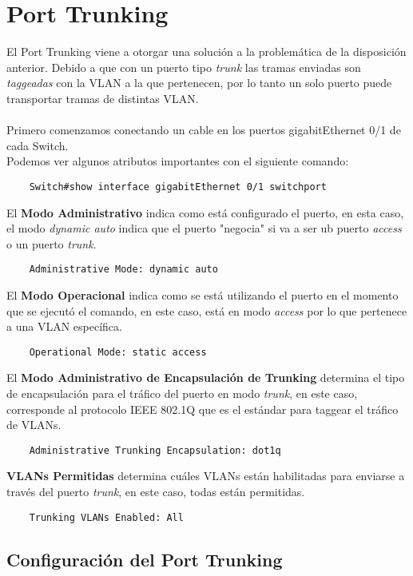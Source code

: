 \documentclass{article}
\begin{document}
\section{Port Trunking}
El Port Trunking viene a otorgar una solución a la problemática de la disposición anterior. Debido a que con un puerto tipo \textit{trunk} las tramas enviadas son \textit{taggeadas} con la VLAN a la que pertenecen, por lo tanto un solo puerto puede transportar tramas de distintas VLAN.
\\\\
Primero comenzamos conectando un cable en los puertos gigabitEthernet 0/1 de cada Switch.
\\
Podemos ver algunos atributos importantes con el siguiente comando:
\begin{lstlisting}
    Switch#show interface gigabitEthernet 0/1 switchport
\end{lstlisting}
El \textbf{Modo Administrativo} indica como está configurado el puerto, en esta caso, el modo \textit{dynamic auto} indica que el puerto "negocia" si va a ser ub puerto \textit{access} o un puerto \textit{trunk}.
\begin{lstlisting}
    Administrative Mode: dynamic auto
\end{lstlisting}
El \textbf{Modo Operacional} indica como se está utilizando el puerto en el momento que se ejecutó el comando, en este caso, está en modo \textit{access} por lo que pertenece a una VLAN específica.
\begin{lstlisting}
    Operational Mode: static access
\end{lstlisting}
El \textbf{Modo Administrativo de Encapsulación de Trunking} determina el tipo de encapsulación para el tráfico del puerto en modo \textit{trunk}, en este caso, corresponde al protocolo IEEE 802.1Q que es el estándar para taggear el tráfico de VLANs.
\begin{lstlisting}
    Administrative Trunking Encapsulation: dot1q
\end{lstlisting}
\textbf{VLANs Permitidas} determina cuáles VLANs están habilitadas para enviarse a través del puerto \textit{trunk}, en este caso, todas están permitidas.
\begin{lstlisting}
    Trunking VLANs Enabled: All
\end{lstlisting}
\subsection{Configuración del Port Trunking}
\end{document}
